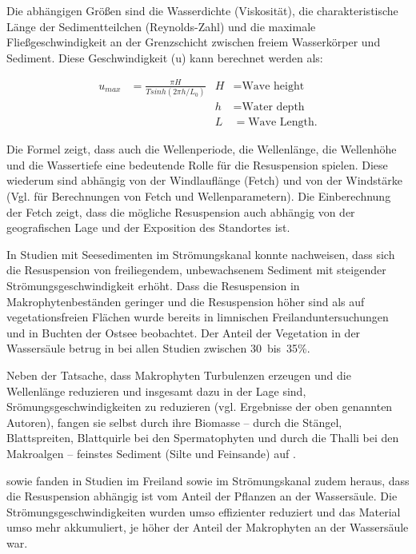 Die abhängigen Größen sind die Wasserdichte (Viskosität), die charakteristische Länge der Sedimentteilchen (Reynolds-Zahl) und die maximale Fließgeschwindigkeit an der Grenzschicht zwischen freiem Wasserkörper und Sediment. Diese Geschwindigkeit (u) kann berechnet werden als:

\begin{align*}
u_{max} &= \frac{\pi H}{T sinh (2 \pi h / L_{0})} & H &=\text{Wave height}\\ 
        &     				                     & h &= \text{Water depth}\\
        &										 & L &= \text{Wave Length}.
\end{align*}


Die Formel zeigt, dass auch die Wellenperiode, die Wellenlänge, die Wellenhöhe und die Wassertiefe eine bedeutende Rolle für die Resuspension spielen. Diese wiederum sind abhängig von der Windlauflänge (Fetch) und von der Windstärke (Vgl. \cite{laenen_1996} für Berechnungen von Fetch und Wellenparametern). Die Einberechnung der Fetch zeigt, dass die mögliche Resuspension auch abhängig von der geografischen Lage und der Exposition des Standortes ist. 

In Studien mit Seesedimenten im Strömungskanal konnte \cite{hu_2011} nachweisen, dass sich die Resuspension von freiliegendem, unbewachsenem Sediment mit steigender Strömungsgeschwindigkeit erhöht. 
Dass die Resuspension in Makrophytenbeständen geringer und die Resuspension höher sind als auf vegetationsfreien Flächen wurde bereits in limnischen Freilanduntersuchungen \citep{horppila_2003, horppila_2005} und in Buchten der Ostsee \citep{kaitaranta_2013} beobachtet. Der Anteil der Vegetation in der Wassersäule betrug in bei allen Studien zwischen \unit{30 bis 35}{\%}.

Neben der Tatsache, dass Makrophyten Turbulenzen erzeugen und die Wellenlänge reduzieren und insgesamt dazu in der Lage sind, Srömungsgeschwindigkeiten zu reduzieren (vgl. Ergebnisse der oben genannten Autoren), fangen sie selbst durch ihre Biomasse – durch die Stängel, Blattspreiten, Blattquirle bei den Spermatophyten und durch die Thalli bei den Makroalgen – feinstes Sediment (Silte und Feinsande) auf \citep{ma_2008}. 

\cite{ward_1984} sowie \cite{fonseca_1986} fanden in Studien im Freiland sowie im Strömungskanal zudem heraus, dass die Resuspension abhängig ist vom Anteil der Pflanzen an der Wassersäule. Die Strömungsgeschwindigkeiten wurden umso effizienter reduziert und das Material umso mehr akkumuliert, je höher der Anteil der Makrophyten an der Wassersäule war. 

